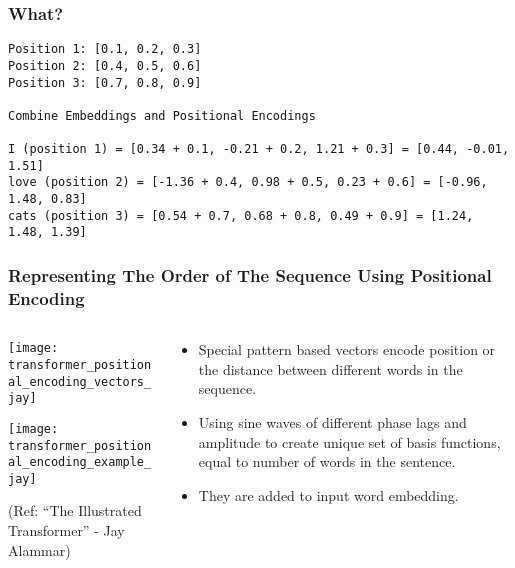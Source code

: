 \begin{frame}[fragile]\frametitle{What?}

\begin{lstlisting}
Position 1: [0.1, 0.2, 0.3]
Position 2: [0.4, 0.5, 0.6]
Position 3: [0.7, 0.8, 0.9]

Combine Embeddings and Positional Encodings

I (position 1) = [0.34 + 0.1, -0.21 + 0.2, 1.21 + 0.3] = [0.44, -0.01, 1.51]
love (position 2) = [-1.36 + 0.4, 0.98 + 0.5, 0.23 + 0.6] = [-0.96, 1.48, 0.83]
cats (position 3) = [0.54 + 0.7, 0.68 + 0.8, 0.49 + 0.9] = [1.24, 1.48, 1.39]
\end{lstlisting}


\end{frame}



\begin{frame}[fragile]\frametitle{Representing The Order of The Sequence Using Positional Encoding}


\begin{columns}
    \begin{column}[T]{0.5\linewidth}
\begin{center}
\texttt{[image: transformer\_positional\_encoding\_vectors\_jay]}

\texttt{[image: transformer\_positional\_encoding\_example\_jay]}


{\tiny (Ref: ``The Illustrated Transformer'' - Jay Alammar)}
\end{center}		

		\end{column}
    \begin{column}[T]{0.5\linewidth}

\begin{itemize}
\item Special pattern based vectors encode position or the distance between different words in the sequence. 
\item Using sine waves of different phase lags and amplitude to create unique set of basis functions, equal to number of words in the sentence.
\item They are added to input word embedding.
\end{itemize}
    \end{column}
  \end{columns}
\end{frame}


